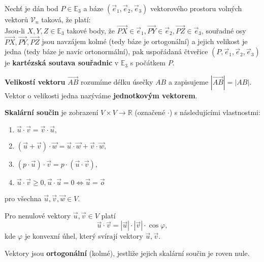 \begin{definition}
    Nechť je dán bod $P\in \mathbb E_3$ a báze $(\vec e_1, \vec e_2, \vec e_3)$ vektorového
    prostoru volných vektorů $\mathscr V_n$ taková, že platí:\\
    Jsou-li $X,Y,Z\in \mathbb E_3$ takové body, že
    $\overrightarrow{PX}\in\vec e_1,\overrightarrow{PY}\in\vec e_2,
    \overrightarrow{PZ}\in\vec e_3$, souřadné osy $\overrightarrow{PX},\overrightarrow{PY},
    \overrightarrow{PZ}$ jsou navzájem kolmé (tedy báze je ortogonální) a jejich velikost je jedna (tedy báze je navíc ortonormální),
    pak uspořádaná čtveřice $(P, \vec e_1, \vec e_2, \vec e_3)$ je \textbf{kartézská
    soutava souřadnic} v $\mathbb E_3$ s počátkem $P$.
\end{definition}

\begin{definition}
\textbf{Velikostí vektoru} $\overrightarrow{AB}$ rozumíme délku úsečky $AB$ a zapisujeme
$|\overrightarrow{AB}| = |AB|.$ Vektor o velikosti jedna nazýváme \textbf{jednotkovým
vektorem}.
\end{definition}

\begin{definition}
\textbf{Skalární součin} je zobrazení $V\times V\to \mathbb R$ (označené $\cdot$) s následujícími vlastnostmi:
\begin{enumerate}[$i.$]
\item $\vec u \cdot \vec v = \vec v \cdot \vec u,$
\item $(\vec u+\vec v)\cdot \vec w = \vec u\cdot \vec w + \vec v\cdot \vec w,$
\item $(p\cdot \vec u)\cdot \vec v = p\cdot(\vec u \cdot \vec v),$
\item $\vec u\cdot \vec v \geq 0, \vec u \cdot \vec u = 0 \iff \vec u = \vec o$
\end{enumerate}
pro všechna $\vec u, \vec v, \vec w \in V.$
\end{definition}

\begin{veta}
    Pro nenulové vektory $\vec u, \vec v \in V$ platí
    $$\vec u \cdot \vec v = |\vec u|\cdot |\vec v|\cdot \cos \varphi,$$
    kde $\varphi$ je konvexní úhel, který svírají vektory $\vec u, \vec v.$
\end{veta}

\begin{definition}
    Vektory jsou \textbf{ortogonální} (kolmé), jestliže jejich skalární součin
    je roven nule.
\end{definition}

